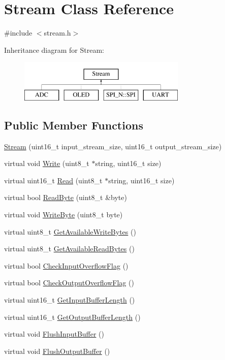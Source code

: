 \hypertarget{class_stream}{\section{Stream Class Reference}
\label{class_stream}
}


{\ttfamily \#include $<$stream.\-h$>$}

Inheritance diagram for Stream\-:\begin{figure}[H]
\begin{center}
\leavevmode
\includegraphics[height=2.000000cm]{class_stream}
\end{center}
\end{figure}
\subsection*{Public Member Functions}
\begin{DoxyCompactItemize}
\item 
\hyperlink{class_stream_a2b738d6f4d3059de2ae3d444d68663bf}{Stream} (uint16\-\_\-t input\-\_\-stream\-\_\-size, uint16\-\_\-t output\-\_\-stream\-\_\-size)
\item 
virtual void \hyperlink{class_stream_a508be3423e4d99ab2757275fb723002a}{Write} (uint8\-\_\-t $\ast$string, uint16\-\_\-t size)
\item 
virtual uint16\-\_\-t \hyperlink{class_stream_a851572e5787cd98383d5118de378724b}{Read} (uint8\-\_\-t $\ast$string, uint16\-\_\-t size)
\item 
virtual bool \hyperlink{class_stream_a6db4180f5834073f992608b856bddca2}{Read\-Byte} (uint8\-\_\-t \&byte)
\item 
virtual void \hyperlink{class_stream_aeaed767b3a8d946c6f81465fa83ff17f}{Write\-Byte} (uint8\-\_\-t byte)
\item 
virtual uint8\-\_\-t \hyperlink{class_stream_a6a16ddb03d3360cef4daf4d38245091d}{Get\-Available\-Write\-Bytes} ()
\item 
virtual uint8\-\_\-t \hyperlink{class_stream_a71cec6c46f3d50cc3ab420e93ae434e1}{Get\-Available\-Read\-Bytes} ()
\item 
virtual bool \hyperlink{class_stream_a088c4e68d568acfad715c56f408fe9f8}{Check\-Input\-Overflow\-Flag} ()
\item 
virtual bool \hyperlink{class_stream_aee6c201819b874c5934a270592d9d311}{Check\-Output\-Overflow\-Flag} ()
\item 
virtual uint16\-\_\-t \hyperlink{class_stream_a4860b9602c68ab437520d321e4e97212}{Get\-Input\-Buffer\-Length} ()
\item 
virtual uint16\-\_\-t \hyperlink{class_stream_ad8aea9131dbc1b422bdba2408d63492a}{Get\-Output\-Buffer\-Length} ()
\item 
virtual void \hyperlink{class_stream_ac7e3629626c1ea4d9cba88db1e048132}{Flush\-Input\-Buffer} ()
\item 
virtual void \hyperlink{class_stream_a0af6193f98fcf7bcd60eef84fce8699c}{Flush\-Output\-Buffer} ()
\end{DoxyCompactItemize}
